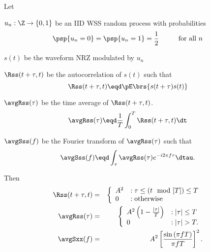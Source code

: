 \begin{theorem}
\label{thm:NRZ_stat}
Let
\begin{liste}
   \item $u_n:\Z\to\{0,1\}$ be an IID WSS random process with probabilities 
         \[ \psp\{u_n=0\}=\psp\{u_n=1\}= \frac{1}{2} \hspace{1cm}\mbox{for all $n$}\]
   \item $s(t)$ be the waveform NRZ modulated by $u_n$
   \item $\Rss(t+\tau,t)$ be the autocorrelation of $s(t)$ such that
         \[ \Rss(t+\tau,t) \eqd \pE\brs{s(t+\tau)s(t)}\]
   \item $\avgRss(\tau)$ be the time average of $\Rss(t+\tau,t)$.
         \[ \avgRss(\tau) \eqd \frac{1}{T}\int_0^T \Rss(t+\tau,t) \dt \]
   \item $\avgSss(f)$ be the Fourier transform of $\avgRss(\tau)$ such that
         \[ \avgSss(f) \eqd \int_\tau \avgRss(\tau) e^{-i2\pi f\tau} \dtau.\]
\end{liste}

Then 
\begin{eqnarray*}
   \Rss(t+\tau,t) 
     &=& \left\{
         \begin{array}{ll}
            A^2 &:\tau \le (t\mod[T])\le T \\
            0 & :\mbox{otherwise}
         \end{array}
         \right.
\\
   \avgRss(\tau) 
     &=& \left\{
         \begin{array}{ll}
            A^2\left( 1- \frac{|\tau|}{T}\right) &:|\tau|\le T \\
            0 & :|\tau|>T.
         \end{array}
         \right.
\\
   \avgSxx(f) 
     &=& A^2 \left[ \frac{\sin\left(\pi fT\right)}{\pi fT}\right]^2.
\end{eqnarray*}
\end{theorem}


